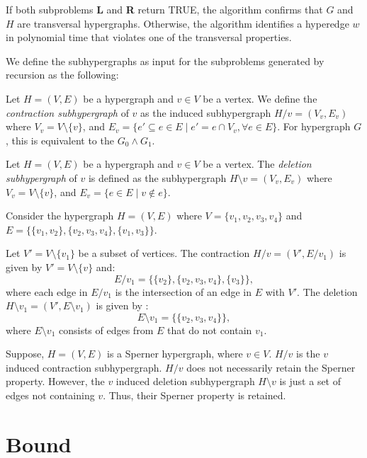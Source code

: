 If both subproblems \textbf{L} and \textbf{R} return TRUE, the algorithm confirms that $G$ and $H$ are transversal hypergraphs. Otherwise, the algorithm identifies a hyperedge $w$ in polynomial time that violates one of the transversal properties.

We define the subhypergraphs as input for the subproblems generated by \FKA{} recursion as the following:

\begin{definition}\label{def:contraction}
Let $H=(V,E)$ be a hypergraph and $v\in V$ be a vertex. We define the \emph{contraction subhypergraph} of $v$ as the induced subhypergraph $H/v=(V_v,E_v)$ where $V_v=V\setminus\{v\}$, and $E_v=\{e'\subseteq e\in E\mid e'=e\cap V_v,\forall e\in E\}$. For hypergraph $G$, this is equivalent to the $G_0\wedge G_1$.
\end{definition}

\begin{definition}\label{def:deletion}
Let $H=(V,E)$ be a hypergraph and $v\in V$ be a vertex. The \emph{deletion subhypergraph} of $v$ is defined as the subhypergraph $H\setminus v=(V_v,E_v)$ where $V_v=V\setminus\{v\}$, and $E_v=\{e\in E\mid v\notin e\}$.
\end{definition}

\begin{example}
Consider the hypergraph $H=(V,E)$ where $V=\{v_1,v_2,v_3,v_4\}$ and $E=\{\{v_1,v_2\},\{v_2,v_3,v_4\},\{v_1,v_3\}\}$.

Let $V'=V\setminus\{v_1\}$ be a subset of vertices. The contraction $H/v=(V',E/v_1)$ is given by $V'=V\setminus\{v\}$ and:
\[
E/v_1=\{\{v_2\},\{v_2,v_3,v_4\},\{v_3\}\},
\]
where each edge in $E/v_1$ is the intersection of an edge in $E$ with $V'$. The deletion $H\setminus v_1=(V',E\setminus v_1)$ is given by :
\[
E\setminus v_1=\{\{v_2,v_3,v_4\}\},
\]
where $E\setminus v_1$ consists of edges from $E$ that do not contain $v_1$.
\end{example}

Suppose, $H=(V,E)$ is a Sperner hypergraph, where $v\in V$. $H/v$ is the $v$ induced contraction subhypergraph. $H/v$ does not necessarily retain the Sperner property. However, the $v$ induced deletion subhypergraph $H\setminus v$ is just a set of edges not containing $v$. Thus, their Sperner property is retained.

\section{\FKA{} Bound}

